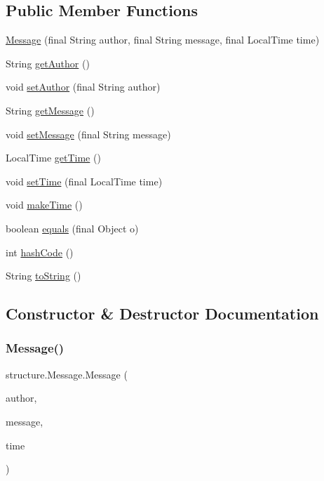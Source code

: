 \subsection*{Public Member Functions}
\begin{DoxyCompactItemize}
\item 
\hyperlink{classstructure_1_1_message_a9608c61c1b9a4985db065a86b3e88b10}{Message} (final String author, final String message, final Local\+Time time)
\item 
String \hyperlink{classstructure_1_1_message_a74a4d9d06a57a259434d3a1c8d4305a5}{get\+Author} ()
\item 
void \hyperlink{classstructure_1_1_message_a71321e51a130574d5c3e92b113d38a81}{set\+Author} (final String author)
\item 
String \hyperlink{classstructure_1_1_message_acd0de72e2ae0e0f993b7843c3f5c494c}{get\+Message} ()
\item 
void \hyperlink{classstructure_1_1_message_a1907224cce70e3247d280965bb74b412}{set\+Message} (final String message)
\item 
Local\+Time \hyperlink{classstructure_1_1_message_a851f4b7a16a0f568da25b4a59a9ef4eb}{get\+Time} ()
\item 
void \hyperlink{classstructure_1_1_message_a7e2febd60ee915acad6cdabea44af622}{set\+Time} (final Local\+Time time)
\item 
void \hyperlink{classstructure_1_1_message_a4b7cc15e72f9c4c0cf98c06edea73529}{make\+Time} ()
\item 
boolean \hyperlink{classstructure_1_1_message_a1ed9266f67fed4a68e264d69b219d5b9}{equals} (final Object o)
\item 
int \hyperlink{classstructure_1_1_message_a9d0d32152bd93f3e3bf1f59a5b82b4ef}{hash\+Code} ()
\item 
String \hyperlink{classstructure_1_1_message_a7c4f04f22c5ff83311e33cd54e7f4ce3}{to\+String} ()
\end{DoxyCompactItemize}


\subsection{Constructor \& Destructor Documentation}
\mbox{\label{classstructure_1_1_message_a9608c61c1b9a4985db065a86b3e88b10}} 
\subsubsection{\texorpdfstring{Message()}{Message()}}
{\footnotesize\ttfamily structure.\+Message.\+Message (\begin{DoxyParamCaption}\item[{final String}]{author,  }\item[{final String}]{message,  }\item[{final Local\+Time}]{time }\end{DoxyParamCaption})}



